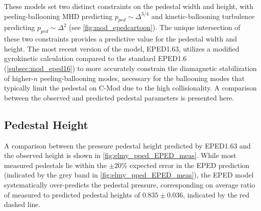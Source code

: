 \noindent These models set two distinct constraints on the pedestal width and height, with peeling-ballooning MHD predicting $p_{ped} \sim \Delta^{3/4}$ and kinetic-ballooning turbulence predicting $p_{ped} \sim \Delta^2$ (see \cref{fig:mod_epedcartoon}).  The unique intersection of these two constraints provides a predictive value for the pedestal width and height.  The most recent version of the model, EPED1.63, utilizes a modified gyrokinetic calculation compared to the standard EPED1.6 (\cref{subsec:mod_eped16}) to more accurately constrain the diamagnetic stabilization of higher-$n$ peeling-ballooning modes, necessary for the ballooning modes that typically limit the pedestal on C-Mod due to the high collisionality.  A comparison between the observed and predicted pedestal parameters is presented here.

\subsection{Pedestal Height}\label{subsec:elmy_eped_height}

A comparison between the pressure pedestal height predicted by EPED1.63 and the observed height is shown in \cref{fig:elmy_pped_EPED_meas}.  While most measured pedestals lie within the $\pm 20\%$ expected error in the EPED prediction (indicated by the grey band in \cref{fig:elmy_pped_EPED_meas}), the EPED model systematically over-predicts the pedestal pressure, corresponding on average ratio of measured to predicted pedestal heights of $0.835 \pm 0.036$, indicated by the red dashed line.

\begin{figure}[h]
 \pushtooutside
\end{figure}

